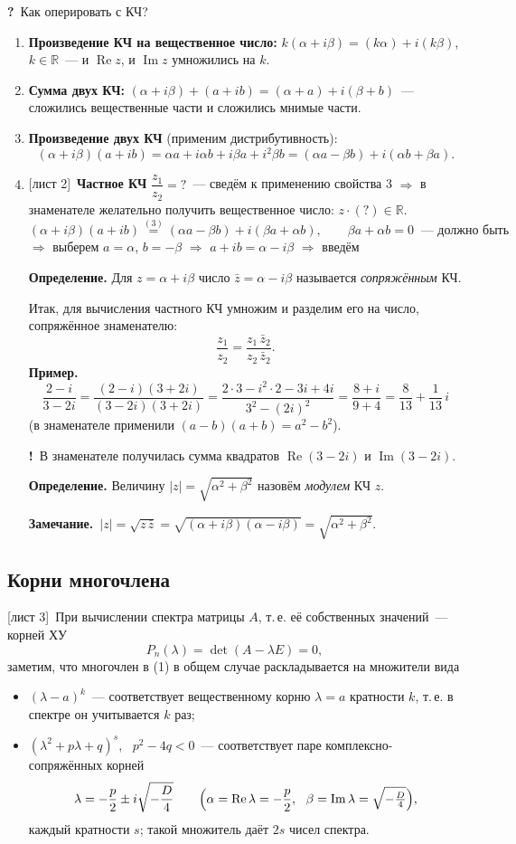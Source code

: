\documentclass[a4paper,11pt]{article}
\newcommand{\q}{\textbf{\color{red!70!black}?}\ }
\newcommand{\imp}{\textbf{\color{red!70!black}!}\ }
\newcommand{\zam}{\textbf{Замечание.}\ }
\newcommand{\prim}{\textbf{Пример.}\ }
\newcommand{\hwlist}[1]{{\small\color{gray}[#1]}}
\newcommand{\Rez}{\operatorname{Re}}
\newcommand{\Imz}{\operatorname{Im}}
\begin{document}
\q Как оперировать с КЧ?
\begin{enumerate}[label=\arabic*.]
\item \textbf{Произведение КЧ на вещественное число:} $k(\alpha+i\beta)=(k\alpha)+i(k\beta)$, $k\in\mathbb R$~---
и $\Rez z$, и $\Imz z$ умножились на $k$.
\item \textbf{Сумма двух КЧ:} $(\alpha+i\beta)+(a+ib)=(\alpha+a)+i(\beta+b)$~--- сложились вещественные
части и сложились мнимые части.
\item \textbf{Произведение двух КЧ} (применим дистрибутивность):
\[
(\alpha+i\beta)(a+ib)=\alpha a+i\alpha b+i\beta a+i^2\beta b=(\alpha a-\beta b)+i(\alpha b+\beta a).
\]
\item \hwlist{лист 2}\ \textbf{Частное КЧ} $\dfrac{z_1}{z_2}=?$~--- сведём к применению свойства 3
$\Rightarrow$ в знаменателе желательно получить вещественное число: $z\cdot(?)\in\mathbb R$.
\[
(\alpha+i\beta)(a+ib)\overset{(3)}{=}(\alpha a-\beta b)+i(\beta a+\alpha b),\qquad
\beta a+\alpha b=0\ \text{~--- должно быть}
\]
$\Rightarrow$ выберем $a=\alpha$, $b=-\beta$ $\Rightarrow$ $a+ib=\alpha-i\beta$ $\Rightarrow$ введём
\begin{opr}
\textbf{Определение.} Для $z=\alpha+i\beta$ число $\bar z=\alpha-i\beta$ называется \emph{сопряжённым} КЧ.
\end{opr}
Итак, для вычисления частного КЧ умножим и разделим его на число, сопряжённое знаменателю:
\[
\frac{z_1}{z_2}=\frac{z_1\,\bar z_2}{z_2\,\bar z_2}.
\]
\prim
\[
\frac{2-i}{3-2i}=\frac{(2-i)(3+2i)}{(3-2i)(3+2i)}
=\frac{2\cdot3-i^2\cdot2-3i+4i}{3^2-(2i)^2}=\frac{8+i}{9+4}=\frac{8}{13}+\frac{1}{13}\,i
\]
(в знаменателе применили $(a-b)(a+b)=a^2-b^2$).

\imp В знаменателе получилась сумма квадратов $\Rez(3-2i)$ и $\Imz(3-2i)$.
\begin{opr}
\textbf{Определение.} Величину $|z|=\sqrt{\alpha^2+\beta^2}$ назовём \emph{модулем} КЧ $z$.
\end{opr}
\zam $|z|=\sqrt{z\,\bar z}=\sqrt{(\alpha+i\beta)(\alpha-i\beta)}=\sqrt{\alpha^2+\beta^2}$.
\end{enumerate}

\subsection{Корни многочлена}
\hwlist{лист 3}\ При вычислении спектра матрицы $A$, т.\,е. её собственных значений~--- корней ХУ
\[
P_n(\lambda)=\det(A-\lambda E)=0,\tag{1}
\]
заметим, что многочлен в (1) в общем случае раскладывается на множители вида
\begin{itemize}
\item $(\lambda-a)^k$~--- соответствует вещественному корню $\lambda=a$ кратности $k$, т.\,е. в спектре
он учитывается $k$ раз;
\item $(\lambda^2+p\lambda+q)^s$, \ $p^2-4q<0$~--- соответствует паре комплексно-сопряжённых корней
\[
\lambda=-\frac p2\pm i\sqrt{-\frac D4}\qquad
\Bigl(\alpha=\Rez\lambda=-\frac p2,\ \ \beta=\Imz\lambda=\sqrt{-\tfrac D4}\Bigr),
\]
каждый кратности $s$; такой множитель даёт $2s$ чисел спектра.
\end{itemize}
\end{document}
